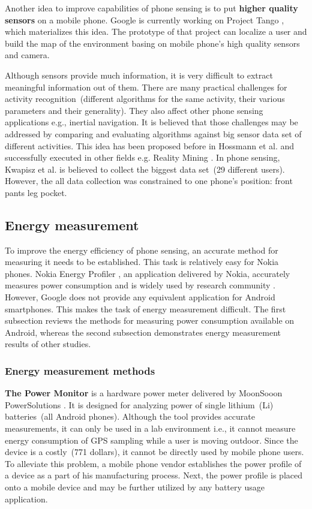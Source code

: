 Another idea to improve capabilities of phone sensing is to put \textbf{higher quality sensors} on a mobile phone. Google is currently working on Project Tango \cite{google:tango}, which materializes this idea. The prototype of that project can localize a user and build the map of the environment basing on mobile phone's high quality sensors and camera. 		
		
Although sensors provide much information, it is very difficult to extract meaningful information out of them. There are many practical challenges for activity recognition\ (different algorithms for the same activity, their various parameters and their generality). They also affect other phone sensing applications e.g., inertial navigation. It is believed that those challenges may be addressed by comparing and evaluating algorithms against big sensor data set of different activities. This idea has been proposed before in Hossmann et al.\cite{hossmann:bigdatasets} and successfully executed in other fields e.g. Reality Mining \cite{eagle:realitymining}. In phone sensing, Kwapisz et al. \cite{Kwapisz2011} is believed to collect the biggest data set\ (29 different users). However, the all data collection was constrained to one phone's position: front pants leg pocket. 
		
\subsection{Energy measurement}
\hspace{10pt} To improve the energy efficiency of phone sensing, an accurate method for measuring it needs to be established. This task is relatively easy for Nokia phones. Nokia Energy Profiler \cite{nokia:profiler}, an application delivered by Nokia,  accurately measures power consumption and is widely used by research community \cite{kjaergaard:entracked} \cite{lu:jigsaw} \cite{li:status}. However, Google does not provide any equivalent application for Android smartphones. This makes the task of energy measurement difficult. The first subsection reviews the methods for measuring power consumption available on Android, whereas the second subsection demonstrates energy measurement results of other studies.

\subsubsection{Energy measurement methods}
\hspace{10pt} \textbf{The Power Monitor} is a hardware power meter delivered by MoonSooon PowerSolutions \cite{monsoon:powermonitor}.  It is designed for analyzing power of single lithium\ (Li) batteries\ (all Android phones). Although the tool provides accurate measurements, it can only be used in a lab environment i.e., it cannot measure energy consumption of GPS sampling while a user is moving outdoor. Since the device is a costly\ (771 dollars), it cannot be directly used by mobile phone users. To alleviate this problem, a mobile phone vendor establishes the power profile of a device as a part of his manufacturing process. Next, the power profile is placed onto a mobile device \cite{android:powerprofiles} and may be further utilized by any battery usage application.

